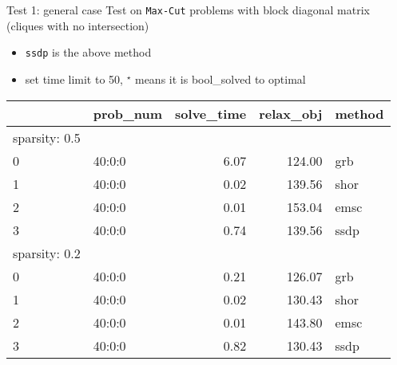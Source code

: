 
\begin{frame}{Test 1: general case}
  Test on \texttt{Max-Cut} problems with block diagonal matrix (cliques with no intersection)
  \begin{itemize}
    \item \texttt{ssdp} is the above method
    \item set time limit to 50, \(^\star\) means it is bool_solved to optimal
  \end{itemize}

  \begin{tabular}{llrrl}
    \toprule
    {} & prob\_num & solve\_time & relax\_obj & method \\
    \midrule
    sparsity: 0.5                                      \\
    0  & 40:0:0    & 6.07        & 124.00     & grb    \\
    1  & 40:0:0    & 0.02        & 139.56     & shor   \\
    2  & 40:0:0    & 0.01        & 153.04     & emsc   \\
    3  & 40:0:0    & 0.74        & 139.56     & ssdp   \\
    \midrule
    sparsity: 0.2                                      \\
    0  & 40:0:0    & 0.21        & 126.07     & grb    \\
    1  & 40:0:0    & 0.02        & 130.43     & shor   \\
    2  & 40:0:0    & 0.01        & 143.80     & emsc   \\
    3  & 40:0:0    & 0.82        & 130.43     & ssdp   \\
    \bottomrule
  \end{tabular}

\end{frame}

